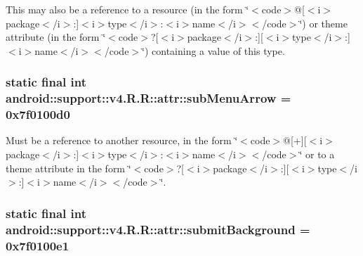 This may also be a reference to a resource (in the form \char`\"{}$<$code$>$@\mbox{[}$<$i$>$package$<$/i$>$:\mbox{]}$<$i$>$type$<$/i$>$:$<$i$>$name$<$/i$>$$<$/code$>$\char`\"{}) or theme attribute (in the form \char`\"{}$<$code$>$?\mbox{[}$<$i$>$package$<$/i$>$:\mbox{]}\mbox{[}$<$i$>$type$<$/i$>$:\mbox{]}$<$i$>$name$<$/i$>$$<$/code$>$\char`\"{}) containing a value of this type. \hypertarget{classandroid_1_1support_1_1v4_1_1_r_1_1attr_37aa7f8a3cedd33edaa0e1ae07599d2d}{
\subsubsection[{subMenuArrow}]{\setlength{\rightskip}{0pt plus 5cm}static final int android::support::v4.R.R::attr::subMenuArrow = 0x7f0100d0}}
\label{classandroid_1_1support_1_1v4_1_1_r_1_1attr_37aa7f8a3cedd33edaa0e1ae07599d2d}


Must be a reference to another resource, in the form \char`\"{}$<$code$>$@\mbox{[}+\mbox{]}\mbox{[}$<$i$>$package$<$/i$>$:\mbox{]}$<$i$>$type$<$/i$>$:$<$i$>$name$<$/i$>$$<$/code$>$\char`\"{} or to a theme attribute in the form \char`\"{}$<$code$>$?\mbox{[}$<$i$>$package$<$/i$>$:\mbox{]}\mbox{[}$<$i$>$type$<$/i$>$:\mbox{]}$<$i$>$name$<$/i$>$$<$/code$>$\char`\"{}. \hypertarget{classandroid_1_1support_1_1v4_1_1_r_1_1attr_25e10fc0bae06e451130eeeafd42b1af}{
\subsubsection[{submitBackground}]{\setlength{\rightskip}{0pt plus 5cm}static final int android::support::v4.R.R::attr::submitBackground = 0x7f0100e1}}
\label{classandroid_1_1support_1_1v4_1_1_r_1_1attr_25e10fc0bae06e451130eeeafd42b1af}



